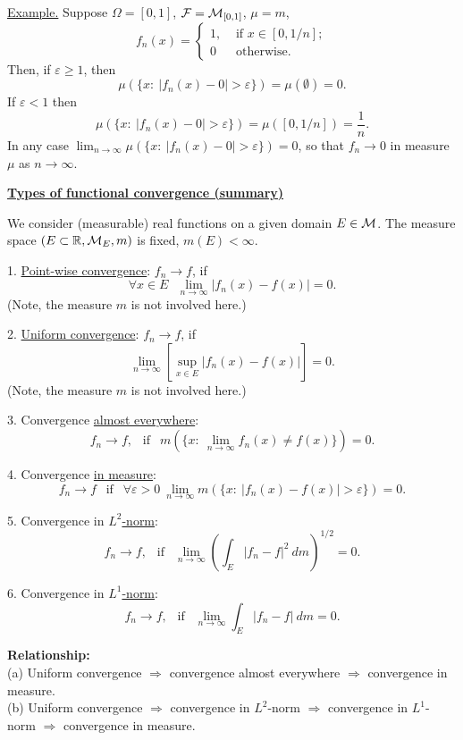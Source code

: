 \documentclass[a4paper,10pt]{article}
\def\RR{\mathbb{R}}
\newcommand{\1}[1]{\mathbf{1}_{\{#1\}}}
\begin{document}
\underline{Example.} Suppose $\Omega=[0,1]$, ${\cal F}={\cal M}_{[0,1]}$, $\mu=m$, \\
 $$f_n(x)=\left\{\begin{array}{ll} 1, & \mbox{ if } x\in[0,1/n]; \\ 0 & \mbox{ otherwise}. \end{array}\right.$$
 Then, if $\varepsilon\ge 1$, then
 $$\mu(\{x:~|f_n(x)-0|>\varepsilon\})=\mu(\emptyset)=0.$$
If $\varepsilon<1$ then
 $$\mu(\{x:~|f_n(x)-0|>\varepsilon\})=\mu([0,1/n])=\frac{1}{n}.$$
In any case
$\lim_{n\to\infty}\mu(\{x:~|f_n(x)-0|>\varepsilon\})=0$, so that $f_n\to 0$ in measure $\mu$ as $n\to\infty$. \vspace{3mm}

\begin{center}\bf\underline{Types of functional convergence (summary)} \end{center}\vspace{3mm}

We consider (measurable) real functions on a given domain $E\in{\cal M}$. The measure space $(E\subset\RR,{\cal M}_E,m)$ is fixed, $m(E)<\infty$.

1. \underline{Point-wise convergence}: $f_n\to f$, if
  $$\forall x\in E~~~\lim_{n\to\infty} |f_n(x)-f(x)|=0.$$
(Note, the measure $m$ is not involved here.)

2. \underline{Uniform convergence}: $f_n\to f$, if
  $$\lim_{n\to\infty} \left[\sup_{x\in E} |f_n(x)-f(x)|\right]=0.$$
(Note, the measure $m$ is not involved here.)

3. Convergence \underline{almost everywhere}:
  $$f_n\to f,~~\mbox{ if } ~~ m(\{x:~\lim_{n\to\infty} f_n(x)\ne f(x)\})=0.$$

4. Convergence \underline{in measure}:
  $$f_n\to f~~\mbox{ if }~~\forall \varepsilon>0~\lim_{n\to\infty} m(\{x:~|f_n(x)-f(x)|>\varepsilon\})=0.$$

5. Convergence in \underline{$L^2$-norm}:
  $$f_n\to f,~~\mbox{ if } ~~ \lim_{n\to\infty}\left(\int_E|f_n-f|^2~dm\right)^{1/2}=0.$$

6. Convergence in  \underline{$L^1$-norm}:
  $$f_n\to f,~~\mbox{ if } ~~ \lim_{n\to\infty}\int_E|f_n-f|~dm=0.$$ \vspace{3mm}

{\bf Relationship:}\\
(a) Uniform convergence $\Longrightarrow$ convergence almost everywhere $\Longrightarrow$ convergence in measure.\\
(b) Uniform convergence $\Longrightarrow$ convergence in $L^2$-norm $\Longrightarrow$ convergence in $L^1$-norm $\Longrightarrow$ convergence in measure.\vspace{3mm}
\end{document}
